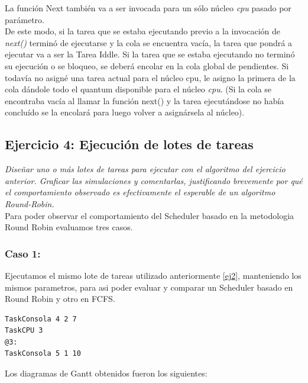 \documentclass[a4paper]{article}
\begin{document}
La funci\'on Next tambi\'en va a ser invocada para un s\'olo n\'ucleo \emph{cpu} pasado por par\'ametro.\\
De este modo, si la tarea que se estaba ejecutando previo a la invocaci\'on de \emph{next()} termin\'o de ejecutarse y la cola se encuentra vac\'ia, la tarea que pondr\'a a ejecutar va a ser la Tarea Iddle.
Si la tarea que se estaba ejecutando no termin\'o su ejecuci\'on o se bloqueo, se deber\'a encolar en la cola global de pendientes.
Si todav\'ia no asign\'e una tarea actual para el n\'ucleo cpu, le asigno la primera de la cola d\'andole todo el quantum disponible para el n\'ucleo \emph{cpu}. (Si la cola se encontraba vac\'ia al llamar la funci\'on next() y la tarea ejecut\'andose no hab\'ia conclu\'ido se la encolar\'a para luego volver a asign\'arsela al n\'ucleo).\\
 
\bigskip 
 
 
 \subsection{Ejercicio 4: Ejecuci\'on de lotes de tareas}
 
\textit{Dise\~nar uno o m\'as lotes de tareas para ejecutar con el algoritmo del ejercicio anterior. Graficar las simulaciones y comentarlas, justificando brevemente por qu\'e el comportamiento observado es efectivamente el esperable de un algoritmo Round-Robin.}\\


Para poder observar el comportamiento del Scheduler basado en la metodologia Round Robin evaluamos tres casos.

\subsubsection{Caso 1:}

Ejecutamos el mismo lote de tareas utilizado anteriormente \ref{ej2}, manteniendo los mismos parametros, para asi poder evaluar y comparar un Scheduler basado en Round Robin y otro en FCFS. 

	\begin{codesnippet}
	\begin{verbatim}
TaskConsola 4 2 7
TaskCPU 3
@3:
TaskConsola 5 1 10
	\end{verbatim}
	\end{codesnippet}

Los diagramas de Gantt obtenidos fueron los siguientes:\\
\end{document}

